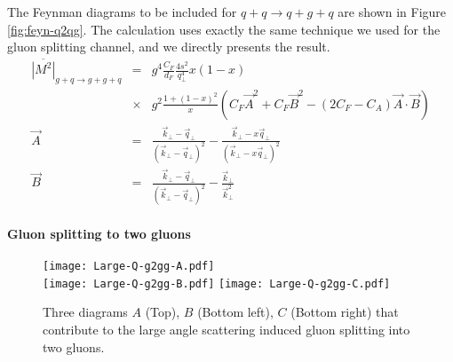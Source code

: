 The Feynman diagrams to be included for $q+q\rightarrow q+g+q$ are shown in Figure \ref{fig:feyn-q2qg}.
The calculation uses exactly the same technique we used for the gluon splitting channel, and we directly presents the result.
\begin{eqnarray}
\overline{|M^2|}_{g+q\rightarrow g+g+q} &=& 
 g^4 \frac{C_F}{d_F}\frac{4s^2}{q_\perp^4}x(1-x) \\\nonumber
&\times&g^2\frac{1+(1-x)^2}{x}  
\left(C_F\vec{A}^2 + C_F\vec{B}^2 - \left(2C_F-C_A\right)\vec{A}\cdot\vec{B}\right)\\
\vec{A} &=& \frac{\vec{k}_\perp - \vec{q}_\perp}{(\vec{k}_\perp - \vec{q}_\perp)^2} -  \frac{\vec{k}_\perp - x\vec{q}_\perp}{(\vec{k}_\perp - x\vec{q}_\perp)^2} \\
\vec{B} &=& \frac{\vec{k}_\perp - \vec{q}_\perp}{(\vec{k}_\perp - \vec{q}_\perp)^2} -  \frac{\vec{k}_\perp}{\vec{k}_\perp^2}
\end{eqnarray}


\paragraph*{Gluon splitting to two gluons}
\begin{figure}
\centering
\texttt{[image: Large-Q-g2gg-A.pdf]}\\
\vspace{1em}
\texttt{[image: Large-Q-g2gg-B.pdf]}\hfill
\texttt{[image: Large-Q-g2gg-C.pdf]}
\caption{Three diagrams $A$ (Top), $B$ (Bottom left), $C$ (Bottom right) that contribute to the large angle scattering induced gluon splitting into two gluons.}
\label{fig:feyn-g2gg}
\end{figure}


